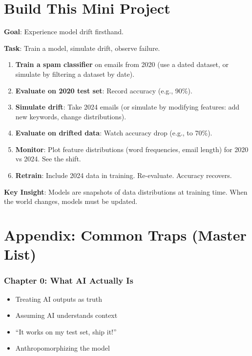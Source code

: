 \documentclass[11pt,oneside]{book}
\begin{document}
\section{Build This Mini Project}

\textbf{Goal}: Experience model drift firsthand.

\textbf{Task}: Train a model, simulate drift, observe failure.

\begin{enumerate}
\item \textbf{Train a spam classifier} on emails from 2020 (use a dated dataset, or simulate by filtering a dataset by date).

\item \textbf{Evaluate on 2020 test set}: Record accuracy (e.g., 90\%).

\item \textbf{Simulate drift}: Take 2024 emails (or simulate by modifying features: add new keywords, change distributions).

\item \textbf{Evaluate on drifted data}: Watch accuracy drop (e.g., to 70\%).

\item \textbf{Monitor}: Plot feature distributions (word frequencies, email length) for 2020 vs 2024. See the shift.

\item \textbf{Retrain}: Include 2024 data in training. Re-evaluate. Accuracy recovers.
\end{enumerate}

\textbf{Key Insight}: Models are snapshots of data distributions at training time. When the world changes, models must be updated.

\section*{Appendix: Common Traps (Master List)}

\subsubsection*{Chapter 0: What AI Actually Is}

\begin{itemize}
\item Treating AI outputs as truth
\item Assuming AI understands context
\item ``It works on my test set, ship it!''
\item Anthropomorphizing the model
\end{itemize}
\end{document}
